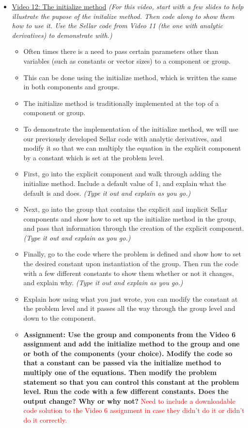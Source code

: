 \documentclass[12pt, letterpaper]{article}
\begin{document}
\begin{itemize}
	\item \underline{Video 12: The initialize method} \textit{(For this video, start with a few slides to help illustrate the pupose of the initalize method. Then code along to show them how to use it. Use the Sellar code from Video 11 (the one with analytic derivatives) to demonstrate with.)}
		\begin{itemize}
			\item Often times there is a need to pass certain parameters other than variables (such as constants or vector sizes) to a component or group.
			\item This can be done using the initialize method, which is written the same in both components and groups.
			\item The initialize method is traditionally implemented at the top of a component or group.
			\item To demonstrate the implementation of the initialize method, we will use our previously developed Sellar code with analytic derivatives, and modify it so that we can multiply the equation in the explicit component by a constant which is set at the problem level. 
			\item First, go into the explicit component and walk through adding the initialize method. Include a default value of 1, and explain what the default is and does. \textit{(Type it out and explain as you go.)}
			\item Next, go into the group that contains the explicit and implicit Sellar components and show how to set up the initialize method in the group, and pass that information through the creation of the explicit component. \textit{(Type it out and explain as you go.)}
			\item Finally, go to the code where the problem is defined and show how to set the desired constant upon instantiation of the group. Then run the code with a few different constants to show them whether or not it changes, and explain why. \textit{(Type it out and explain as you go.)}
			\item Explain how using what you just wrote, you can modify the constant at the problem level and it passes all the way through the group level and down to the component.
			\item \textbf{Assignment: Use the group and components from the Video 6 assignment and add the initialize method to the group and one or both of the components (your choice). Modify the code so that a constant can be passed via the initialize method to multiply one of the equations. Then modify the problem statement so that you can control this constant at the problem level. Run the code with a few different constants. Does the output change? Why or why not?} \textcolor{red}{Need to include a downloadable code solution to the Video 6 assignment in case they didn't do it or didn't do it correctly.}
		\end{itemize}
		

\end{itemize}
\end{document}
